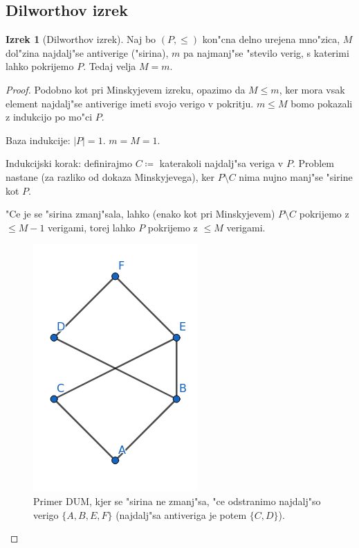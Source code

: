 \documentclass[a4paper,12pt]{article}
\theoremstyle{definition}
\newtheorem{theorem}[counter]{Izrek}
\theoremstyle{remark}
\begin{document}
\subsection{Dilworthov izrek}
\begin{theorem}[Dilworthov izrek]
	Naj bo $(P, \leqslant)$ kon"cna delno urejena mno"zica, $M$ dol"zina najdalj"se antiverige ("sirina), $m$ pa najmanj"se "stevilo verig, s katerimi lahko pokrijemo $P$. Tedaj velja $M = m$.
\end{theorem}
\begin{proof}
	Podobno kot pri Minskyjevem izreku, opazimo da $M \leqslant m$, ker mora vsak element najdalj"se antiverige imeti svojo verigo v pokritju. $m \leqslant M$ bomo pokazali z indukcijo po mo"ci $P$.
	
	Baza indukcije: $|P| = 1$. $m = M = 1$.
	
	Indukcijski korak: definirajmo $C \coloneqq$ katerakoli najdalj"sa veriga v $P$. Problem nastane (za razliko od dokaza Minskyjevega), ker $P \setminus C$ nima nujno manj"se "sirine kot $P$.
	
	"Ce je se "sirina zmanj"sala, lahko (enako kot pri Minskyjevem) $P\setminus C$ pokrijemo z $\leqslant M-1$ verigami, torej lahko $P$ pokrijemo z $\leqslant M$ verigami.
	
	\begin{figure}[h!]
		\centering
		\includegraphics[scale=0.6]{dilworth}
		\caption{Primer DUM, kjer se "sirina ne zmanj"sa, "ce odstranimo najdalj"so verigo $\{A, B, E, F\}$ (najdalj"sa antiveriga je potem $\{C, D\}$).}
	\end{figure}
	

\end{proof}
\end{document}
